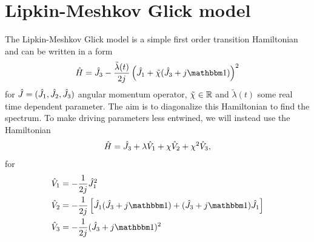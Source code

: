 \chapter{Lipkin-Meshkov Glick model}
The Lipkin-Meshkov Glick model is a simple first order transition Hamiltonian and can be written in a form
\begin{equation}
    \HH=\J_3-\frac{\tilde\lambda(t)}{2j}\left(\J_1+\tilde\chi(\J_3+j\Id)\right)^2
    \label{eq:firstOrderTransitionHamiltonianOriginal}
\end{equation}
for $\hat{J}=(\hat{J}_1,\hat{J}_2,\hat{J}_3)$ angular momentum operator, $\tilde\chi\in\mathbb{R}$ and $\tilde\lambda(t)$ some real time dependent parameter. The aim is to diagonalize this Hamiltonian to find the spectrum. To make driving parameters less entwined, we will instead use the Hamiltonian
\begin{equation}
    \hat{H}=\hat{J}_3+\lambda\hat V_1 +\chi \hat V_2+\chi^2 \hat V_3,
    \label{eq:firstOrderTransitionHamiltonian}
\end{equation}
for
\begin{align}
    \hat V_1 &=-\frac{1}{2j}\J_1^2\\
    \hat V_2 &= -\frac{1}{2j}\left[\J_1(\J_3+j\Id)+(\J_3+j\Id)\J_1\right]\\
    \hat V_3 &= -\frac{1}{2j}(\J_3+j\Id)^2
\end{align}



